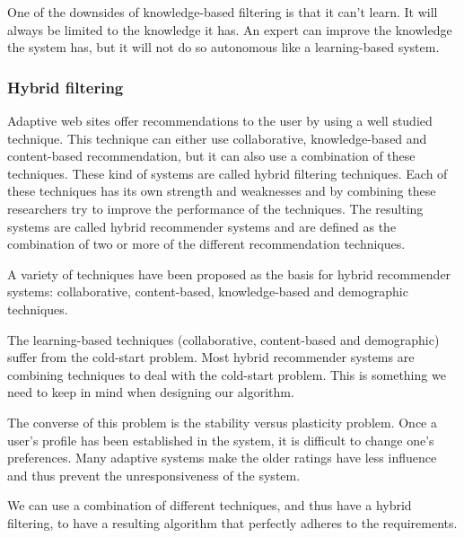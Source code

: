 \documentclass[]{article}
\begin{document}
One of the downsides of knowledge-based filtering is that it can't learn.
It will always be limited to the knowledge it has.
An expert can improve the knowledge the system has, but it will not do so autonomous like a learning-based system.

\subsubsection{Hybrid filtering}
Adaptive web sites offer recommendations to the user by using a well studied technique.
This technique can either use collaborative, knowledge-based and content-based recommendation, but it can also use a combination of these techniques.
These kind of systems are called hybrid filtering techniques.
Each of these techniques has its own strength and weaknesses and by combining these researchers try to improve the performance of the techniques.
The resulting systems are called hybrid recommender systems and are defined as the combination of two or more of the different recommendation techniques.

A variety of techniques have been proposed as the basis for hybrid recommender systems: collaborative, content-based, knowledge-based and demographic techniques.

The learning-based techniques (collaborative, content-based and demographic) suffer from the cold-start problem.
Most hybrid recommender systems are combining techniques to deal with the cold-start problem.
This is something we need to keep in mind when designing our algorithm.

The converse of this problem is the stability versus plasticity problem.
Once a user's profile has been established in the system, it is difficult to change one's preferences.
Many adaptive systems make the older ratings have less influence and thus prevent the unresponsiveness of the system.

We can use a combination of different techniques, and thus have a hybrid filtering, to have a resulting algorithm that perfectly adheres to the requirements.
\end{document}
